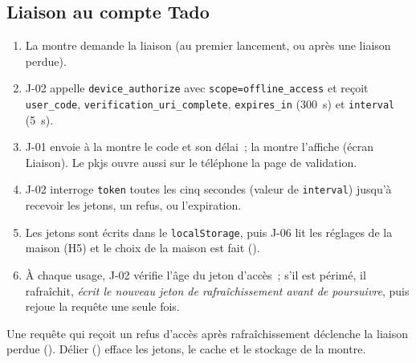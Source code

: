 \subsection{Liaison au compte Tado}
\label{sec:liaison}

\begin{enumerate}
  \item La montre demande la liaison (au premier lancement, ou après une liaison perdue).
  \item J-02 appelle \texttt{device\_authorize} avec \texttt{scope=offline\_access} et reçoit
        \texttt{user\_code}, \texttt{verification\_uri\_complete}, \texttt{expires\_in} (300~s) et
        \texttt{interval} (5~s).
  \item J-01 envoie à la montre le code et son délai~; la montre l'affiche (écran Liaison). Le
        pkjs ouvre aussi sur le téléphone la page de validation.
  \item J-02 interroge \texttt{token} toutes les cinq secondes (valeur de \texttt{interval}) jusqu'à
        recevoir les jetons, un refus, ou l'expiration.
  \item Les jetons sont écrits dans le \texttt{localStorage}, puis J-06 lit les réglages de la maison
        (H5) et le choix de la maison est fait ().
  \item À chaque usage, J-02 vérifie l'âge du jeton d'accès~; s'il est périmé, il rafraîchit,
        \emph{écrit le nouveau jeton de rafraîchissement avant de poursuivre}, puis rejoue la requête
        une seule fois.
\end{enumerate}

Une requête qui reçoit un refus d'accès après rafraîchissement déclenche la liaison perdue
(). Délier () efface les jetons, le cache et le
stockage de la montre.
